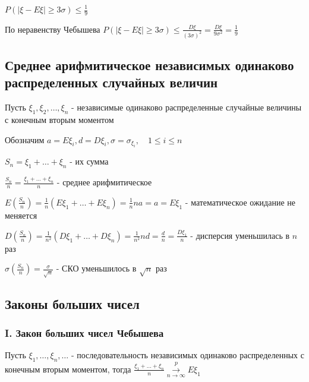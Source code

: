 \documentclass[12pt]{article}
\begin{document}
    \hypertarget{ruleofthreesigmas}{}

    \begin{MyTheorem}
        \Ths $P(|\xi - E\xi| \geq 3\sigma) \leq \frac{1}{9}$
    \end{MyTheorem}

    \begin{MyProof}
        По неравенству Чебышева $P(|\xi - E\xi| \geq 3\sigma) \leq \frac{D\xi}{(3\sigma)^2} = \frac{D\xi}{9\sigma^2} = \frac{1}{9}$
    \end{MyProof}

    \hypertarget{averagevalueofrandomvariables}{}

    \subsection{Среднее арифмитическое независимых одинаково распределенных случайных величин}

    Пусть $\xi_1, \xi_2, \dots, \xi_n$ - независимые одинаково распределенные случайные величины с конечным вторым моментом

    Обозначим $a = E\xi_i, d = D\xi_i, \sigma = \sigma_{\xi_i}, \quad 1 \leq i \leq n$

    $S_n = \xi_1 + \dots + \xi_n$ - их сумма

    $\frac{S_n}{n} = \frac{\xi_1 + \dots + \xi_n}{n}$ - среднее арифмитическое

    $E\left(\frac{S_n}{n}\right) = \frac{1}{n} (E\xi_1 + \dots + E\xi_n) = \frac{1}{n} na = a = E\xi_1$ - математическое ожидание не меняется

    $D\left(\frac{S_n}{n}\right) = \frac{1}{n^2} (D\xi_1 + \dots + D\xi_n) = \frac{1}{n^2} nd = \frac{d}{n} = \frac{D\xi_1}{n}$ - дисперсия уменьшилась в $n$ раз

    $\sigma\left(\frac{S_n}{n}\right) = \frac{\sigma}{\sqrt{n}}$ - СКО уменьшилось в $\sqrt{n}$ раз

    \subsection{Законы больших чисел}

    \hypertarget{lawofbignumberschebyshev}{}

    \subsubsection{I. Закон больших чисел Чебышева}

    \begin{MyTheorem}
        \Ths Пусть $\xi_1, \dots, \xi_n, \dots$ - последовательность независимых одинаково распределенных с конечным вторым моментом,
        тогда $\frac{\xi_1 + \dots + \xi_n}{n} \overset{p}{\underset{n \to \infty}{\longrightarrow}} E\xi_1$
    \end{MyTheorem}
\end{document}
